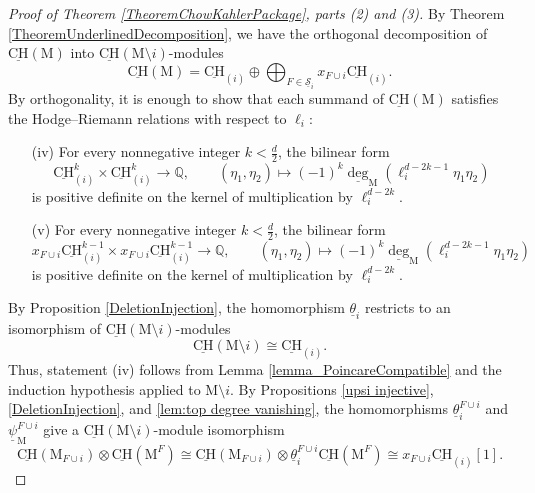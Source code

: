 \documentclass[11pt,reqno]{amsart}
\theoremstyle{definition}
\theoremstyle{remark}
\renewcommand{\(}{\left(}
\renewcommand{\)}{\right)}
\newcommand{\<}{\left<}
\renewcommand{\>}{\right>}
\begin{document}
\begin{proof}[Proof of Theorem \ref{TheoremChowKahlerPackage}, parts (2) and (3)]
By Theorem \ref{TheoremUnderlinedDecomposition}, we have the orthogonal decomposition of 
$\underline{\mathrm{CH}}(\mathrm{M})$ into $\underline{\mathrm{CH}}(\mathrm{M}\setminus i)$-modules
\[
\underline{\mathrm{CH}}(\mathrm{M}) = \underline{\mathrm{CH}}_{(i)} \oplus \bigoplus_{F \in \underline{\mathscr{S}}_i} x_{F\cup i} \underline{\mathrm{CH}}_{(i)}. 
\]
By orthogonality, it is enough to show that each summand of $\underline{\mathrm{CH}}(\mathrm{M}) $ 
satisfies the Hodge--Riemann relations with respect to $\ell_i$:
\begin{enumerate}[(1)]\itemsep 5pt
\item[(iv)] For every nonnegative integer $k < \frac{d}{2}$, the bilinear form
\[
\underline{\mathrm{CH}}^k_{(i)}  \times \underline{\mathrm{CH}}^k_{(i)} \longrightarrow \mathbb{Q}, \qquad (\eta_1,\eta_2)\longmapsto (-1)^k \underline{\deg}_\mathrm{M}(\ell_i^{d-2k-1} \eta_1\eta_2)
\]
is positive definite on the kernel of multiplication by $\ell_i^{d-2k}$.
\item[(v)]  For every nonnegative integer $k < \frac{d}{2}$, the bilinear form
\[
x_{F\cup i}\underline{\mathrm{CH}}^{k-1}_{(i)}  \times x_{F\cup i}\underline{\mathrm{CH}}^{k-1}_{(i)} \longrightarrow \mathbb{Q}, \qquad (\eta_1,\eta_2)\longmapsto (-1)^k \underline{\deg}_\mathrm{M}(\ell_i^{d-2k-1} \eta_1\eta_2)
\]
is positive definite on the kernel of multiplication by $\ell_i^{d-2k}$.
\end{enumerate}
By Proposition \ref{DeletionInjection}, the homomorphism $\underline{\theta}_i$ restricts to an isomorphism of 
$\underline{\mathrm{CH}}(\mathrm{M}\setminus i)$-modules 
\[
\underline{\mathrm{CH}}(\mathrm{M} \setminus i) \cong \underline{\mathrm{CH}}_{(i)}.
\]
Thus, statement (iv) follows from Lemma \ref{lemma_PoincareCompatible} and the induction hypothesis applied to $\mathrm{M} \setminus i$.
By Propositions \ref{upsi injective}, \ref{DeletionInjection}, and \ref{lem:top degree vanishing}, 
the homomorphisms $\underline{\theta}_i^{F\cup i}$ and $\underline{\psi}^{F\cup i}_{\mathrm{M}}$ 
give a $\underline{\mathrm{CH}}(\mathrm{M}\setminus i)$-module isomorphism
\[
\underline{\mathrm{CH}}(\mathrm{M}_{F \cup i})\otimes  \underline{\mathrm{CH}}(\mathrm{M}^F)  \cong 
\underline{\mathrm{CH}}(\mathrm{M}_{F \cup i})\otimes \underline{\theta}_i^{F\cup i} \underline{\mathrm{CH}}(\mathrm{M}^F)  \cong x_{F \cup i} \underline{\mathrm{CH}}_{(i)}[1].
\]

\end{proof}
\end{document}
